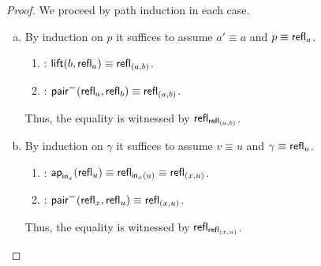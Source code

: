 \begin{proof}
    We proceed by path induction in each case.
    \begin{enumerate}[a),font=\upshape]
        \item By induction on $p$ it suffices to assume $a'\equiv a$ and $p\equiv\mathsf{refl}_a$.
        \begin{enumerate}[-]
            \item \lhs: $\mathsf{lift}(b,\mathsf{refl}_a)\equiv\mathsf{refl}_{(a,b)}$.
            \item \rhs: $\mathsf{pair}^{\mathrel{=_{}}}(\mathsf{refl}_a, \mathsf{refl}_b)\equiv\mathsf{refl}_{(a,b)}$.
        \end{enumerate}
        Thus, the equality is witnessed by $\mathsf{refl}_{\mathsf{refl}_{(a,b)}}$.

        \item By induction on $\gamma$ it suffices to assume $v\equiv u$ and $\gamma\equiv\mathsf{refl}_u$.
        \begin{enumerate}[-]
            \item \lhs: $\mathsf{ap}_{\mathsf{in}_x}(\mathsf{refl}_u)\equiv\mathsf{refl}_{\mathsf{in}_x(u)} \equiv \mathsf{refl}_{(x,u)}$.
            \item \rhs: $\mathsf{pair}^{\mathrel{=_{}}}(\mathsf{refl}_x, \mathsf{refl}_u)\equiv\mathsf{refl}_{(x,u)}$.
        \end{enumerate}
        Thus, the equality is witnessed by $\mathsf{refl}_{\mathsf{refl}_{(x,u)}}$.\qedhere
    \end{enumerate}
\end{proof}


